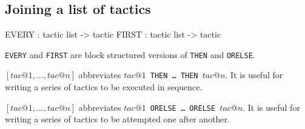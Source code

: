 \subsection{Joining a list of tactics}
\begin{ttbox} 
EVERY : tactic list -> tactic
FIRST : tactic list -> tactic
\end{ttbox}
{\tt EVERY} and {\tt FIRST} are block structured versions of {\tt THEN} and
{\tt ORELSE}\@.
\begin{ttdescription}
\item[\ttindexbold{EVERY} {$[tac@1,\ldots,tac@n]$}] 
abbreviates \hbox{\tt$tac@1$ THEN \ldots{} THEN $tac@n$}.  It is useful for
writing a series of tactics to be executed in sequence.

\item[\ttindexbold{FIRST} {$[tac@1,\ldots,tac@n]$}] 
abbreviates \hbox{\tt$tac@1$ ORELSE \ldots{} ORELSE $tac@n$}.  It is useful for
writing a series of tactics to be attempted one after another.
\end{ttdescription}


